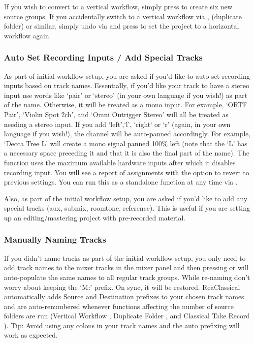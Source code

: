 \documentclass[10pt,american]{article}
\begin{document}
If you wish to convert to a vertical workflow, simply press  to create
six new source groups. If you accidentally switch to a vertical workflow via
, \keys{\textbackslash} (duplicate folder) or similar, simply undo via
 and press  to set the project to a horizontal workflow
again.

\subsubsection{Auto Set Recording Inputs / Add Special Tracks}

As part of initial workflow setup, you are asked if you'd like to auto set
recording inputs based on track names. Essentially, if you'd like your track to
have a stereo input use words like `pair' or `stereo' (in your own language if
you wish!) as part of the name. Otherwise, it will be treated as a mono input.
For example, `ORTF Pair', `Violin Spot 2ch', and `Omni Outrigger Stereo' will
all be treated as needing a stereo input. If you add `left',`l', `right` or `r'
(again, in your own language if you wish!), the channel will be auto-panned
accordingly. For example, `Decca Tree L' will create a mono signal panned 100\%
left (note that the `L' has a necessary space preceding it and that it is also
the final part of the name). The function uses the maximum available hardware
inputs after which it disables recording input. You will see a report of
assignments with the option to revert to previous settings. You can run this as
a standalone function at any time via .

Also, as part of the initial workflow setup, you are asked if you'd like to add
any special tracks (aux, submix, roomtone, reference). This is useful if you are
setting up an editing/mastering project with pre-recorded material.

\subsubsection{Manually Naming Tracks }

If you didn't name tracks as part of the initial workflow setup, you only need
to add track names to the mixer tracks in the mixer panel and then pressing
 or  will auto-populate the same names to all regular track
groups. While re-naming don't worry about keeping the `M:' prefix. On sync, it
will be restored. ReaClassical automatically adds Source and Destination
prefixes to your chosen track names and are auto-renumbered whenever functions
affecting the number of source folders are run (Vertical Workflow ,
Duplicate Folder \keys{\textbackslash}, and Classical Take Record ).
Tip: Avoid using any colons in your track names and the auto prefixing will work
as expected. 
\end{document}
